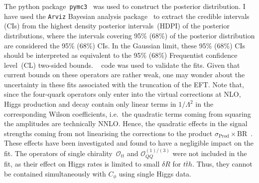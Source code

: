 	The python package~\texttt{pymc3}~\cite{Salvatier2016} was used to construct the posterior distribution. I have used the \texttt{Arviz} Bayesian analysis package~\cite{arviz_2019} to extract the credible intervals (CIs) from the highest density posterior intervals~(HDPI) of the posterior distributions, where the intervals covering 95\% (68\%) of the posterior distribution are considered the 95\% (68\%) CIs. In the Gaussian limit, these  95\% (68\%) CIs should be interpreted as equivalent to the 95\%  (68\%) Frequentist  confidence level~(CL) two-sided bounds. \HEPfit~\cite{deBlas:2019okz} code was used to validate the fits.
	Given that current bounds on these operators are rather weak, one may wonder about the uncertainty in these fits associated with the truncation of the EFT.
	Note that, since the four-quark operators only enter into the virtual corrections at NLO, Higgs production and decay contain only linear terms in $1/\Lambda^{2}$ in the corresponding Wilson coefficients, i.e.~the quadratic terms coming from squaring the amplitudes are technically NNLO. 
	Hence, the quadratic effects in the signal strengths coming from not linearising the corrections to the product $\sigma_\mathrm{ Prod} \times \mathrm{ BR}$~\!.  These effects have been investigated and found to have a negligible impact on the fit. 
	The operators of single chirality~$\mathcal O_{tt}$ and $\mathcal{O}_{QQ}^{(1)/(3)}$ were not included in the fit, as their effect on Higgs rates is limited to small $\delta R$ for $t\bar t h$. Thus, they cannot be contained simultaneously with $C_\phi$ using single Higgs data.  
	\newpage
	\begingroup
	 
	\endgroup
	\FloatBarrier
